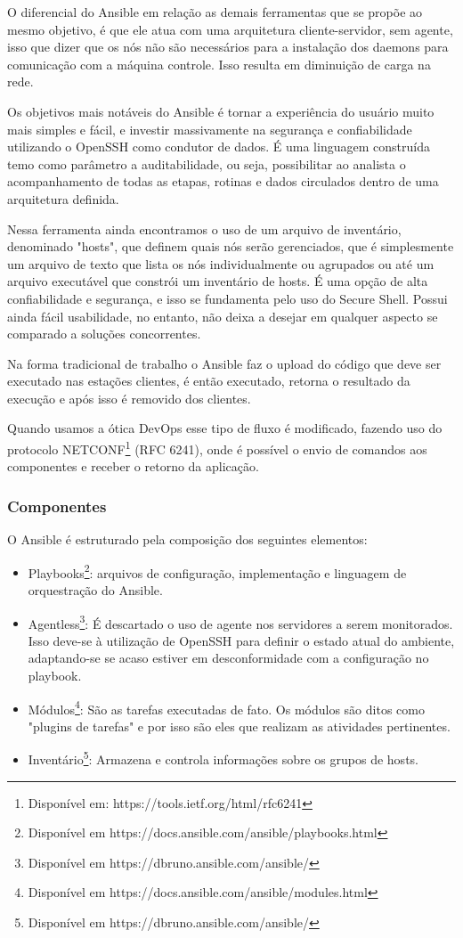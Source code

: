 O diferencial do Ansible em relação as demais ferramentas que se propõe ao mesmo objetivo, é que ele atua com uma arquitetura cliente-servidor, sem agente,  isso que dizer que os nós não são necessários para a instalação dos daemons para comunicação com a máquina controle. Isso resulta em diminuição de carga na rede. 

Os objetivos mais notáveis do Ansible é tornar a experiência do usuário muito mais simples e fácil, e investir massivamente na segurança e confiabilidade utilizando o OpenSSH como condutor de dados. É uma linguagem construída temo como parâmetro a auditabilidade, ou seja, possibilitar ao analista o acompanhamento de todas as etapas, rotinas e dados circulados dentro de uma arquitetura definida.\cite{marcelocosta}

Nessa ferramenta ainda encontramos o uso de um arquivo de inventário, denominado "hosts", que definem quais nós serão gerenciados, que é simplesmente um arquivo de texto que lista os nós individualmente ou agrupados ou até um arquivo executável que constrói um inventário de hosts. É uma opção de alta confiabilidade e segurança, e isso se fundamenta pelo uso do Secure Shell. Possui ainda fácil usabilidade, no entanto, não deixa a desejar em qualquer aspecto se comparado a soluções concorrentes.

Na forma tradicional de trabalho o Ansible faz o upload do código que deve ser executado nas estações clientes, é então executado, retorna o resultado da execução e após isso é removido dos clientes.

Quando usamos a ótica DevOps esse tipo de fluxo é modificado, fazendo uso do protocolo NETCONF\footnote{Disponível em: https://tools.ietf.org/html/rfc6241} (RFC 6241), onde é possível o envio de comandos aos componentes e receber o retorno da aplicação.

\subsubsection{Componentes}
O Ansible é estruturado pela composição dos seguintes elementos:

\begin{itemize}
	\item Playbooks\footnote{Disponível em https://docs.ansible.com/ansible/playbooks.html}: arquivos de configuração, implementação e linguagem de orquestração do Ansible.
	\item Agentless\footnote{Disponível em https://dbruno.ansible.com/ansible/}: É descartado o uso de agente nos servidores a serem monitorados. Isso deve-se à utilização de OpenSSH para definir o estado atual do ambiente, adaptando-se se acaso estiver em desconformidade com a configuração no playbook.
	\item Módulos\footnote{Disponível em https://docs.ansible.com/ansible/modules.html}: São as tarefas executadas de fato. Os módulos são ditos como "plugins de tarefas" e por isso são eles que realizam as atividades pertinentes.
	\item Inventário\footnote{Disponível em https://dbruno.ansible.com/ansible/}: Armazena e controla informações sobre os grupos de hosts.
\end{itemize}

